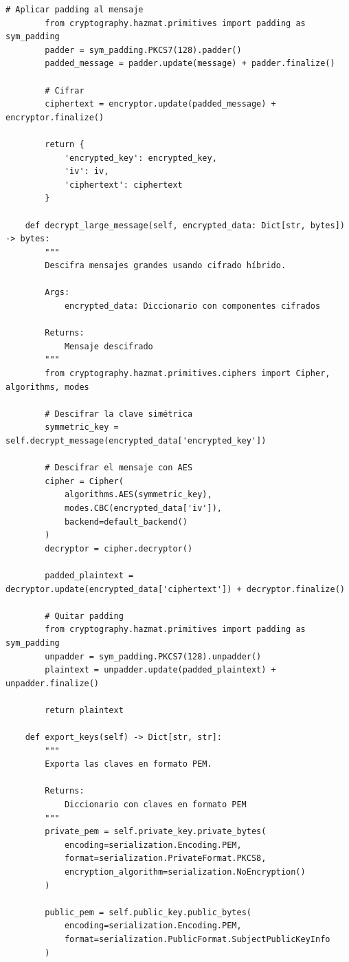 \documentclass[12pt,a4paper]{article}
\begin{document}
\begin{lstlisting}[caption=Implementación de cifrado asimétrico con RSA]
        # Aplicar padding al mensaje
        from cryptography.hazmat.primitives import padding as sym_padding
        padder = sym_padding.PKCS7(128).padder()
        padded_message = padder.update(message) + padder.finalize()
        
        # Cifrar
        ciphertext = encryptor.update(padded_message) + encryptor.finalize()
        
        return {
            'encrypted_key': encrypted_key,
            'iv': iv,
            'ciphertext': ciphertext
        }
    
    def decrypt_large_message(self, encrypted_data: Dict[str, bytes]) -> bytes:
        """
        Descifra mensajes grandes usando cifrado híbrido.
        
        Args:
            encrypted_data: Diccionario con componentes cifrados
            
        Returns:
            Mensaje descifrado
        """
        from cryptography.hazmat.primitives.ciphers import Cipher, algorithms, modes
        
        # Descifrar la clave simétrica
        symmetric_key = self.decrypt_message(encrypted_data['encrypted_key'])
        
        # Descifrar el mensaje con AES
        cipher = Cipher(
            algorithms.AES(symmetric_key),
            modes.CBC(encrypted_data['iv']),
            backend=default_backend()
        )
        decryptor = cipher.decryptor()
        
        padded_plaintext = decryptor.update(encrypted_data['ciphertext']) + decryptor.finalize()
        
        # Quitar padding
        from cryptography.hazmat.primitives import padding as sym_padding
        unpadder = sym_padding.PKCS7(128).unpadder()
        plaintext = unpadder.update(padded_plaintext) + unpadder.finalize()
        
        return plaintext
    
    def export_keys(self) -> Dict[str, str]:
        """
        Exporta las claves en formato PEM.
        
        Returns:
            Diccionario con claves en formato PEM
        """
        private_pem = self.private_key.private_bytes(
            encoding=serialization.Encoding.PEM,
            format=serialization.PrivateFormat.PKCS8,
            encryption_algorithm=serialization.NoEncryption()
        )
        
        public_pem = self.public_key.public_bytes(
            encoding=serialization.Encoding.PEM,
            format=serialization.PublicFormat.SubjectPublicKeyInfo
        )
        

\end{lstlisting}
\end{document}
